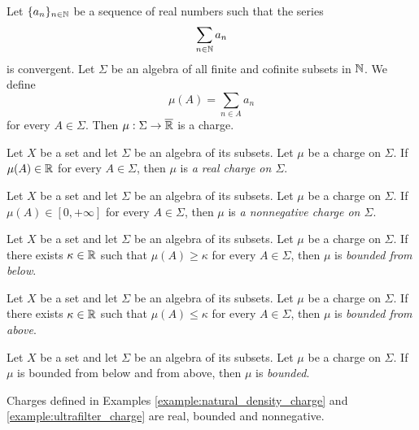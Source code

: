 \begin{example}\label{example:charge_from_series}
    Let $\{a_n\}_{n\in {\mathbb N}}$ be a sequence of real numbers such that the series
    $$\sum_{n\in {\mathbb N}}a_n$$
    is convergent. Let $\Sigma$ be an algebra of all finite and cofinite subsets in ${\mathbb N}$. We define
    $$\mu(A) = \sum_{n \in A} a_n$$
    for every $A \in \Sigma$. Then $\mu:\Sigma \rightarrow \overline{{\mathbb R}}$ is a charge.
\end{example}

\begin{definition}
    Let $X$ be a set and let $\Sigma$ be an algebra of its subsets. Let $\mu$ be a charge on $\Sigma$. If $\mu(A) \in {\mathbb R}$ for every $A \in \Sigma$, then $\mu$ is \textit{a real charge on $\Sigma$}.
\end{definition}

\begin{definition}
    Let $X$ be a set and let $\Sigma$ be an algebra of its subsets. Let $\mu$ be a charge on $\Sigma$. If $\mu(A) \in [0,+\infty]$ for every $A \in \Sigma$, then $\mu$ is \textit{a nonnegative charge on $\Sigma$}.
\end{definition}

\begin{definition}
    Let $X$ be a set and let $\Sigma$ be an algebra of its subsets. Let $\mu$ be a charge on $\Sigma$. If there exists $\kappa \in {\mathbb R}$ such that $\mu(A) \geq
        \kappa$ for every $A \in \Sigma$, then $\mu$ is \textit{bounded from below}.
\end{definition}

\begin{definition}
    Let $X$ be a set and let $\Sigma$ be an algebra of its subsets. Let $\mu$ be a charge on $\Sigma$. If there exists $\kappa \in {\mathbb R}$ such that $\mu(A) \leq
        \kappa$ for every $A \in \Sigma$, then $\mu$ is \textit{bounded from above}.
\end{definition}

\begin{definition}
    Let $X$ be a set and let $\Sigma$ be an algebra of its subsets. Let $\mu$ be a charge on $\Sigma$. If $\mu$ is bounded from below and from above, then $\mu$ is \textit{bounded}.
\end{definition}

\begin{example}\label{example:examples_of_bounded_and_nonnegative_charges}
    Charges defined in Examples \ref{example:natural_density_charge} and \ref{example:ultrafilter_charge} are real, bounded and nonnegative.
\end{example}

